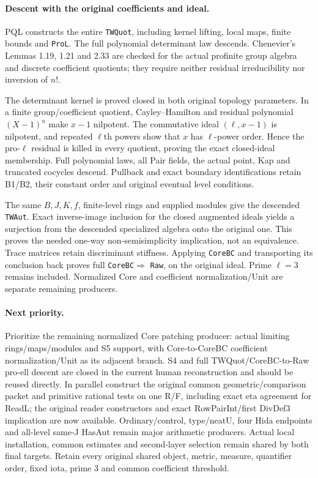 \paragraph{Descent with the original coefficients and ideal.}
PQL constructs the entire \texttt{TWQuot}, including kernel
lifting, local maps, finite bounds and \texttt{ProL}. The full
polynomial determinant law descends. Chenevier's Lemmas 1.19,
1.21 and 2.33 are checked for the actual profinite group algebra
and discrete coefficient quotients; they require neither
residual irreducibility nor inversion of $n!$.

The determinant kernel is proved closed in both original
topology parameters. In a finite group/coefficient quotient,
Cayley--Hamilton and residual polynomial $(X-1)^n$ make
$x-1$ nilpotent. The commutative ideal $(\ell,x-1)$ is
nilpotent, and repeated $\ell$th powers show that $x$ has
$\ell$-power order. Hence the pro-$\ell$ residual is killed
in every quotient, proving the exact closed-ideal membership.
Full polynomial laws, all Pair fields, the actual point,
Kap and truncated cocycles descend. Pullback and exact
boundary identifications retain B1/B2, their constant order
and original eventual level conditions.

The same $B,J,K,f$, finite-level rings and supplied modules
give the descended \texttt{TWAut}. Exact inverse-image
inclusion for the closed augmented ideals yields a surjection
from the descended specialized algebra onto the original one.
This proves the needed one-way non-semisimplicity implication,
not an equivalence. Trace matrices retain discriminant
stiffness. Applying \texttt{CoreBC} and transporting its
conclusion back proves full \texttt{CoreBC}$\Rightarrow$
\texttt{Raw}, on the original ideal. Prime $\ell=3$ remains
included. Normalized Core and coefficient normalization/Unit
are separate remaining producers.

\paragraph{Next priority.}
Prioritize the remaining normalized Core patching producer: actual limiting rings/\allowbreak{}maps/\allowbreak{}modules and S5 support, with Core-to-CoreBC coefficient normalization/\allowbreak{}Unit as its adjacent branch. S4 and full TWQuot/\allowbreak{}CoreBC-to-Raw pro-ell descent are closed in the current human reconstruction and should be reused directly. In parallel construct the original common geometric/\allowbreak{}comparison packet and primitive rational tests on one R/\allowbreak{}F, including exact eta agreement for ReadL; the original reader constructors and exact RowPairInt/\allowbreak{}first DivDef3 implication are now available. Ordinary/\allowbreak{}control, type/\allowbreak{}neatU, four Hida endpoints and all-level same-J HasAut remain major arithmetic producers. Actual local installation, common estimates and second-layer selection remain shared by both final targets. Retain every original shared object, metric, measure, quantifier order, fixed iota, prime 3 and common coefficient threshold.

